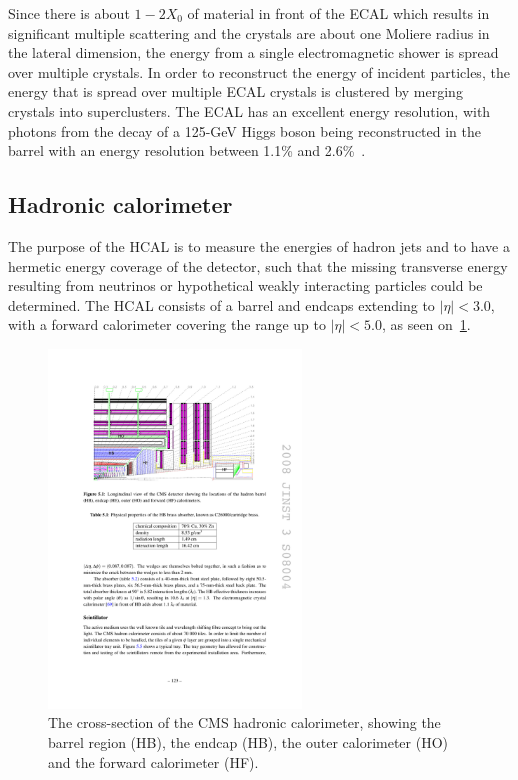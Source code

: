 Since there is about $1-2X_0$ of material in front of the ECAL which results in significant multiple scattering and the crystals are about one Moliere radius in the lateral dimension, the energy from a single electromagnetic shower is spread over multiple crystals. In order to reconstruct the energy of incident particles, the energy that is spread over multiple ECAL crystals is clustered by merging crystals into superclusters. The ECAL has an excellent energy resolution, with photons from the decay of a 125-GeV Higgs boson being reconstructed in the barrel with an energy resolution between 1.1\% and 2.6\%~\cite{Chatrchyan:2013dga}.

\subsection{Hadronic calorimeter}
The purpose of the HCAL is to measure the energies of hadron jets and to have a hermetic energy coverage of the detector, such that the missing transverse energy resulting from neutrinos or hypothetical weakly interacting particles could be determined. The HCAL consists of a barrel and endcaps extending to $|\eta| < 3.0$, with a forward calorimeter covering the range up to $|\eta|<5.0$, as seen on~\cref{fig:hcal}.

\begin{figure}
\begin{centering}
\includegraphics[width=0.6\textwidth]{figures/exp/hcal.pdf}
\caption[The cross-section of the CMS hadronic calorimeter]{The cross-section of the CMS hadronic calorimeter, showing the barrel region (HB), the endcap (HB), the outer calorimeter (HO) and the forward calorimeter (HF).}
\label{fig:hcal}
\end{centering}
\end{figure}


